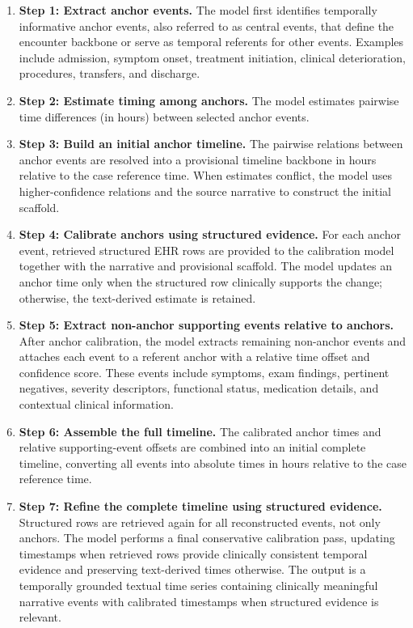 \documentclass{ws-procs11x85}
\begin{document}
\begin{enumerate}
    \item \textbf{Step 1: Extract anchor events.} The model first identifies temporally informative anchor events, also referred to as central events, that define the encounter backbone or serve as temporal referents for other events. Examples include admission, symptom onset, treatment initiation, clinical deterioration, procedures, transfers, and discharge. 

    \item \textbf{Step 2: Estimate timing among anchors.} The model estimates pairwise time differences (in hours) between selected anchor events.

    \item \textbf{Step 3: Build an initial anchor timeline.} The pairwise relations between anchor events are resolved into a provisional timeline backbone in hours relative to the case reference time. When estimates conflict, the model uses higher-confidence relations and the source narrative to construct the initial scaffold.

    \item \textbf{Step 4: Calibrate anchors using structured evidence.} For each anchor event, retrieved structured EHR rows are provided to the calibration model together with the narrative and provisional scaffold. The model updates an anchor time only when the structured row clinically supports the change; otherwise, the text-derived estimate is retained.

    \item \textbf{Step 5: Extract non-anchor supporting events relative to anchors.} After anchor calibration, the model extracts remaining non-anchor events and attaches each event to a referent anchor with a relative time offset and confidence score. These events include symptoms, exam findings, pertinent negatives, severity descriptors, functional status, medication details, and contextual clinical information.
    
    \item \textbf{Step 6: Assemble the full timeline.} The calibrated anchor times and relative supporting-event offsets are combined into an initial complete timeline, converting all events into absolute times in hours relative to the case reference time.
    
    \item \textbf{Step 7: Refine the complete timeline using structured evidence.} Structured rows are retrieved again for all reconstructed events, not only anchors. The model performs a final conservative calibration pass, updating timestamps when retrieved rows provide clinically consistent temporal evidence and preserving text-derived times otherwise. The output is a temporally grounded textual time series containing clinically meaningful narrative events with calibrated timestamps when structured evidence is relevant.
\end{enumerate}
\end{document}
